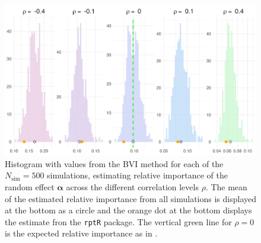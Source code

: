 \begin{figure}[H]
  \centering
    \includegraphics[width=1\linewidth]{Figures/Simulation study/Random_logit.png}
    \caption{Histogram with values from the BVI method for each of the $N_{\text{sim}}=500$ simulations, estimating relative importance of the random effect $\boldsymbol{\alpha}$ across the different correlation levels $\rho$. The mean of the estimated relative importance from all simulations is displayed at the bottom as a circle and the orange dot at the bottom displays the estimate fron the \texttt{rptR} package. The vertical green line for $\rho=0$ is the expected relative importance as in .}
    \label{fig:relimp_random_logit}
\end{figure}
